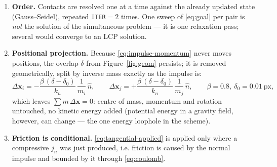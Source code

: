 \documentclass[a4paper,11pt]{article}
\newcommand{\x}{\bm{x}}
\newcommand{\hh}{\hat{n}}
\begin{document}
\begin{enumerate}[label=(\arabic*)]
\item \textbf{Order.} Contacts are resolved one at a time against the already
  updated state (Gauss--Seidel), repeated \texttt{ITER}$=2$ times. One sweep of
  \eqref{eq:goal} per pair is \emph{not} the solution of the simultaneous
  problem --- it is one relaxation pass; several would converge to an LCP
  solution.
\item \textbf{Positional projection.} Because \eqref{eq:impulse-momentum} never
  moves positions, the overlap $\delta$ from Figure~\ref{fig:geom} persists; it
  is removed geometrically, split by inverse mass exactly as the impulse is:
  \[
    \Delta\x_i=-\frac{\beta\,(\delta-\delta_0)}{k_n}\,\frac{1}{m_i}\,\hh,
    \qquad
    \Delta\x_j=+\frac{\beta\,(\delta-\delta_0)}{k_n}\,\frac{1}{m_j}\,\hh,
    \qquad \beta=0.8,\ \delta_0=0.01\ \text{px},
  \]
  which leaves $\sum m\,\Delta\x=0$: centre of mass, momentum and rotation
  untouched, no kinetic energy added (potential energy in a gravity field,
  however, can change --- the one energy loophole in the scheme).
\item \textbf{Friction is conditional.} \eqref{eq:tangential-applied} is applied
  only where a compressive $j_n$ was just produced, i.e. friction is caused by
  the normal impulse and bounded by it through \eqref{eq:coulomb}.
\end{enumerate}

\clearpage
\end{document}

